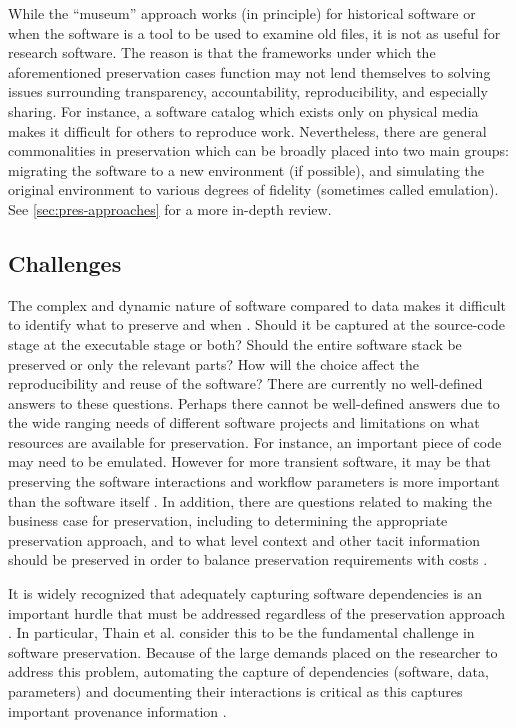 \documentclass[letterpaper,11pt]{article}
\begin{document}
While the ``museum'' approach works (in principle) for historical software or when the software is a tool to be used to examine old files, it is not as useful for research software. The reason is that the frameworks under which the aforementioned preservation cases function may not lend themselves to solving issues surrounding transparency, accountability, reproducibility, and especially sharing. For instance, a software catalog which exists only on physical media makes it difficult for others to reproduce work. Nevertheless, there are general commonalities in preservation which can be broadly placed into two main groups: migrating the software to a new environment (if possible), and simulating the original environment to various degrees of fidelity (sometimes called emulation).  See \cref{sec:pres-approaches} for a more in-depth review. 


\subsection{Challenges}
The complex and dynamic nature of software compared to data makes it difficult to identify what to preserve and when \citep{hong2012}. Should it be captured at the source-code stage at the executable stage or both? Should the entire software stack be preserved or only the relevant parts? How will the choice affect the reproducibility and reuse of the software? There are currently no well-defined answers to these questions. Perhaps there cannot be well-defined answers due to the wide ranging needs of different software projects and limitations on what resources are available for preservation. For instance, an important piece of code may need to be emulated. However for more transient software, it may be that preserving the software interactions and workflow parameters is more important than the software itself \citep{hong2012}.  In addition, there are questions related to making the business case for preservation, including to determining the appropriate preservation approach, and to what level context and other tacit information should be preserved in order to balance preservation requirements with costs \citep{matthews2015}.

It is widely recognized that adequately capturing software dependencies is an important hurdle that must be addressed regardless of the preservation approach \citep{bonazzi2015,hong2014a,rechert2012,thain2015}. In particular, Thain et al. \citep{thain2015} consider this to be the fundamental challenge in software preservation. Because of the large demands placed on the researcher to address this problem, automating the capture of dependencies (software, data, parameters) and documenting their interactions is critical as this captures important provenance information \citep{stodden2014,thain2015,mcphillips2015,ludascher2010}.
\end{document}
